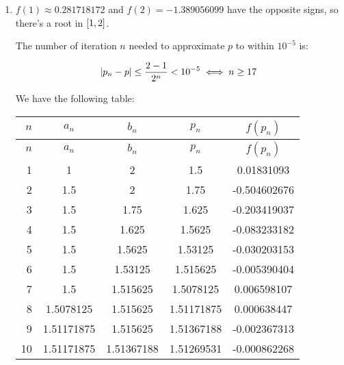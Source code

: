 \documentclass[../../Assignments.tex]{subfiles}
\begin{document}
\begin{solution}
    \begin{enumerate}[label = (\alph*)]
        \item \(f(1) \approx \num{0.281718172}\) and \(f(2) =
            \num{-1.389056099}\) have the opposite signs, so there's a root in
            \(\interval{1}{2}\).

            The number of iteration \(n\) needed to approximate \(p\) to within
            \(10^{-5}\) is:

            \[\abs{p_n - p} \leq \frac{2 - 1}{2^n} < 10^{-5} \iff n \geq 17\]

            We have the following table:

            \begin{longtable}{r S[table-format=1.8] S[table-format=1.8] S[table-format=1.8] S[table-format=-1.9]}
                \toprule
                \(n\)  &   {\(a_n\)}   &   {\(b_n\)}   &   {\(p_n\)}   &  {\(f(p_n)\)}  \\
                \midrule
                \endfirsthead
                \toprule
                \(n\)  &   {\(a_n\)}   &   {\(b_n\)}   &   {\(p_n\)}   &  {\(f(p_n)\)}  \\
                \midrule
                  &  1            &  2            &  1.5          &   0.01831093   \\
                    2  &  1.5          &  2            &  1.75         &  -0.504602676  \\
                    3  &  1.5          &  1.75         &  1.625        &  -0.203419037  \\
                    4  &  1.5          &  1.625        &  1.5625       &  -0.083233182  \\
                    5  &  1.5          &  1.5625       &  1.53125      &  -0.030203153  \\
                    6  &  1.5          &  1.53125      &  1.515625     &  -0.005390404  \\
                    7  &  1.5          &  1.515625     &  1.5078125    &   0.006598107  \\
                    8  &  1.5078125    &  1.515625     &  1.51171875   &   0.000638447  \\
                    9  &  1.51171875   &  1.515625     &  1.51367188   &  -0.002367313  \\
                   10  &  1.51171875   &  1.51367188   &  1.51269531   &  -0.000862268  \\

\end{longtable}
\end{enumerate}
\end{solution}
\end{document}

